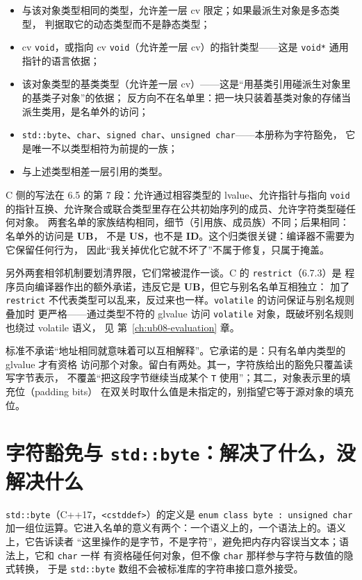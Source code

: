 \documentclass[12pt,a4paper,fontset=fandol]{ctexbook}
\newcommand{\cpp}[1]{C++#1}
\newcommand{\Tp}[1]{\texttt{#1}}
\newcommand{\Lang}[1]{\textsf{#1}}
\newcommand{\CL}{\Lang{C}}
\newcommand{\UB}{\textbf{\textsf{UB}}}
\newcommand{\IDB}{\textbf{\textsf{ID}}}
\newcommand{\USB}{\textbf{\textsf{US}}}
\newcommand{\Clause}[1]{\textsc{\small #1}}
\newcommand{\Hdr}[1]{\texttt{<#1>}}
\begin{document}
\begin{itemize}
\item 与该对象类型相同的类型，允许差一层 cv 限定；如果最派生对象是多态类型，
      判据取它的动态类型而不是静态类型；
\item cv \Tp{void}，或指向 cv \Tp{void}（允许差一层 cv）的指针类型——这是 \Tp{void*}
      通用指针的语言依据；
\item 该对象类型的基类类型（允许差一层 cv）——这是“用基类引用碰派生对象里的基类子对象”的依据；
      反方向不在名单里：把一块只装着基类对象的存储当派生类用，是名单外的访问；
\item \Tp{std::byte}、\Tp{char}、\Tp{signed char}、\Tp{unsigned char}——本册称为字符豁免，
      它是唯一不以类型相符为前提的一族；
\item 与上述类型相差一层引用的类型。
\end{itemize}

\CL{} 侧的写法在 \Clause{6.5} 的第 7 段：允许通过相容类型的 lvalue、允许指针与指向
\Tp{void} 的指针互换、允许聚合或联合类型里存在公共初始序列的成员、允许字符类型碰任何对象。
两套名单的家族结构相同，细节（引用族、成员族）不同；后果相同：名单外的访问是 \UB{}，
不是 \USB{}，也不是 \IDB{}。这个归类很关键：编译器不需要为它保留任何行为，
因此“我关掉优化它就不坏了”不属于修复，只属于掩盖。

另外两套相邻机制要划清界限，它们常被混作一谈。\CL{} 的 \Tp{restrict}（\Clause{6.7.3}）是
程序员向编译器作出的额外承诺，违反它是 \UB{}，但它与别名名单互相独立：
加了 \Tp{restrict} 不代表类型可以乱来，反过来也一样。\Tp{volatile} 的访问保证与别名规则叠加时
更严格——通过类型不符的 glvalue 访问 \Tp{volatile} 对象，既破坏别名规则也绕过 volatile 语义，
见 第~\ref{ch:ub08-evaluation} 章。

\begin{clause}[title={标准怎么说：白名单与它的两处留白}]
标准不承诺“地址相同就意味着可以互相解释”。它承诺的是：只有名单内类型的 glvalue 才有资格
访问那个对象。留白有两处。其一，字符族给出的豁免只覆盖读写字节表示，
不覆盖“把这段字节继续当成某个 \Tp{T} 使用”；其二，对象表示里的填充位（padding bits）
在双关时取什么值是未指定的，别指望它等于源对象的填充位。
\end{clause}

\section{字符豁免与 \Tp{std::byte}：解决了什么，没解决什么}\label{sec:ub06-byte}

\Tp{std::byte}（\cpp{17}，\Hdr{cstddef}）的定义是 \Tp{enum class byte : unsigned char}
加一组位运算。它进入名单的意义有两个：一个语义上的，一个语法上的。语义上，它告诉读者
“这里操作的是字节，不是字符”，避免把内存内容误当文本；语法上，它和 \Tp{char} 一样
有资格碰任何对象，但不像 \Tp{char} 那样参与字符与数值的隐式转换，
于是 \Tp{std::byte} 数组不会被标准库的字符串接口意外接受。
\end{document}
